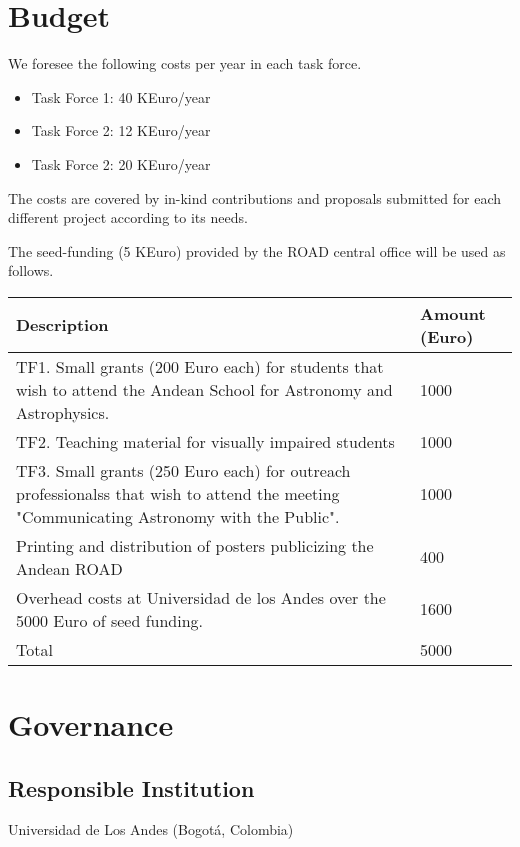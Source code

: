 \documentclass[12pt]{article}
\begin{document}
\section{Budget}

We foresee the following costs per year in each task force. 
\begin{itemize}
\item Task Force 1: 40 KEuro/year
\item Task Force 2: 12 KEuro/year
\item Task Force 2: 20 KEuro/year
\end{itemize}

The costs are covered by in-kind contributions and proposals
submitted for each different project according to its needs.

The seed-funding (5 KEuro) provided by the ROAD central office will be used as follows.

\begin{center}
\begin{tabular}{|p{11cm} |p{1.5cm}|}\hline\hline
Description &Amount (Euro) \\\hline
TF1. Small grants (200 Euro each) for students that wish to attend the
Andean School for Astronomy and Astrophysics. & 1000\\\hline 
TF2.  Teaching material for visually impaired students & 1000\\\hline
TF3. Small grants (250 Euro each) for outreach professionalss that
wish to attend the meeting "Communicating Astronomy with the Public".&
1000\\\hline  
Printing and distribution of posters publicizing the Andean ROAD
&400 \\\hline 
Overhead costs at Universidad de los Andes over the 5000 Euro of seed
funding. & 1600\\\hline 
Total &5000\\\hline\hline
\end{tabular}
\end{center}


\section{Governance}

\subsection*{Responsible Institution}
\noindent
Universidad de Los Andes (Bogotá, Colombia)
\end{document}

